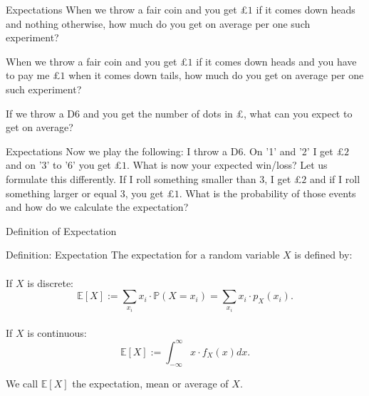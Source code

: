 \documentclass[11pt,pdf,ngerman,UKenglish]{beamer}%
\newcommand{\IP}{\mathbb{P}}
\newcommand{\IE}{{\mathbb{E}}}
\newcommand{\1}{\mathbb{1}}
\theoremstyle{thm}
\theoremstyle{def}
\begin{document}
%


\begin{frame}{Expectations}
When we throw a fair coin and you get \pounds$1$ if it comes down heads and nothing otherwise, how much do you get on average per one such experiment?

\pause
\vfill

When we throw a fair coin and you get \pounds$1$ if it comes down heads and you have to pay me \pounds$1$ when it comes down tails, how much do you get on average per one such experiment?

\pause
\vfill

If we throw a D6 and you get the number of dots in \pounds, what can you expect to get on average?
\end{frame}


\begin{frame}{Expectations}
Now we play the following: I throw a D6. On '1' and '2' I get \pounds$2$ and on '3' to '6' you get \pounds$1$. What is now your expected win/loss?
\vfill
\pause
Let us formulate this differently. If I roll something smaller than 3, I get \pounds$2$ and if I roll something larger or equal 3, you get \pounds$1$. What is the probability of those events and how do we calculate the expectation?
\end{frame}


\begin{frame}{Definition of Expectation}
\begin{block}{Definition: Expectation}
The expectation for a random variable $X$ is defined by:
\\ \ \\
If $X$ is discrete:
$$ \IE [ X ] := \sum_{x_i} x_i \cdot \IP( X = x_i) = \sum_{x_i} x_i \cdot p_X(x_i).$$
\ \\
If $X$ is continuous:
$$ \IE [ X ] := \int_{-\infty}^\infty x \cdot f_X(x) dx.$$
\end{block}
\vfill

We call $\IE[X]$ the expectation, mean or average of $X$.
\end{frame}
\end{document}
